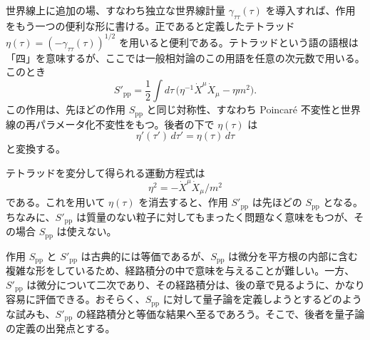 世界線上に追加の場、すなわち独立な世界線計量 $\gamma_{\tau\tau}(\tau)$ を導入すれば、作用をもう一つの便利な形に書ける。正であると定義したテトラッド $\eta(\tau)=(-\gamma_{\tau\tau}(\tau))^{1/2}$ を用いると便利である。テトラッドという語の語根は「四」を意味するが、ここでは一般相対論のこの用語を任意の次元数で用いる。このとき
\begin{equation}
S'_{\mathrm{pp}}=\frac12\int d\tau\,
\bigl(\eta^{-1}\dot X^\mu\dot X_\mu-\eta m^2\bigr).
\tag{1.2.5}\label{eq:1.2.5}
\end{equation}
この作用は、先ほどの作用 $S_{\mathrm{pp}}$ と同じ対称性、すなわち Poincaré 不変性と世界線の再パラメータ化不変性をもつ。後者の下で $\eta(\tau)$ は
\begin{equation}
\eta'(\tau')\,d\tau'=\eta(\tau)\,d\tau
\tag{1.2.6}\label{eq:1.2.6}
\end{equation}
と変換する。

テトラッドを変分して得られる運動方程式は
\begin{equation}
\eta^2=-\dot X^\mu\dot X_\mu/m^2
\tag{1.2.7}\label{eq:1.2.7}
\end{equation}
である。これを用いて $\eta(\tau)$ を消去すると、作用 $S'_{\mathrm{pp}}$ は先ほどの $S_{\mathrm{pp}}$ となる。ちなみに、$S'_{\mathrm{pp}}$ は質量のない粒子に対してもまったく問題なく意味をもつが、その場合 $S_{\mathrm{pp}}$ は使えない。

作用 $S_{\mathrm{pp}}$ と $S'_{\mathrm{pp}}$ は古典的には等価であるが、$S_{\mathrm{pp}}$ は微分を平方根の内部に含む複雑な形をしているため、経路積分の中で意味を与えることが難しい。一方、$S'_{\mathrm{pp}}$ は微分について二次であり、その経路積分は、後の章で見るように、かなり容易に評価できる。おそらく、$S_{\mathrm{pp}}$ に対して量子論を定義しようとするどのような試みも、$S'_{\mathrm{pp}}$ の経路積分と等価な結果へ至るであろう。そこで、後者を量子論の定義の出発点とする。

